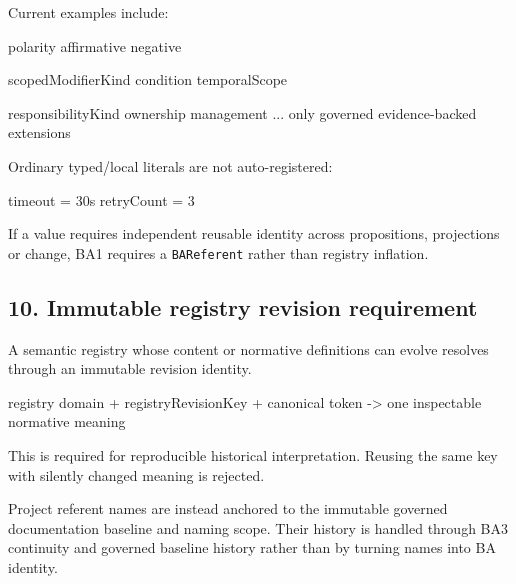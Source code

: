 \documentclass[
  10pt,
  a4paper,
]{article}
\newenvironment{Shaded}{}{}
\newcommand{\NormalTok}[1]{#1}
\begin{document}
Current examples include:

\begin{Shaded}
\begin{Highlighting}[]
\NormalTok{polarity}
\NormalTok{  affirmative}
\NormalTok{  negative}

\NormalTok{scopedModifierKind}
\NormalTok{  condition}
\NormalTok{  temporalScope}

\NormalTok{responsibilityKind}
\NormalTok{  ownership}
\NormalTok{  management}
\NormalTok{  ... only governed evidence{-}backed extensions}
\end{Highlighting}
\end{Shaded}

Ordinary typed/local literals are not auto-registered:

\begin{Shaded}
\begin{Highlighting}[]
\NormalTok{timeout = 30s}
\NormalTok{retryCount = 3}
\end{Highlighting}
\end{Shaded}

If a value requires independent reusable identity across propositions,
projections or change, BA1 requires a \texttt{BAReferent} rather than
registry inflation.

\subsection{10. Immutable registry revision
requirement}\label{10-immutable-registry-revision-requirement}

A semantic registry whose content or normative definitions can evolve
resolves through an immutable revision identity.

\begin{Shaded}
\begin{Highlighting}[]
\NormalTok{registry domain}
\NormalTok{+ registryRevisionKey}
\NormalTok{+ canonical token}
\NormalTok{    {-}\textgreater{} one inspectable normative meaning}
\end{Highlighting}
\end{Shaded}

This is required for reproducible historical interpretation. Reusing the
same key with silently changed meaning is rejected.

Project referent names are instead anchored to the immutable governed
documentation baseline and naming scope. Their history is handled
through BA3 continuity and governed baseline history rather than by
turning names into BA identity.
\end{document}
